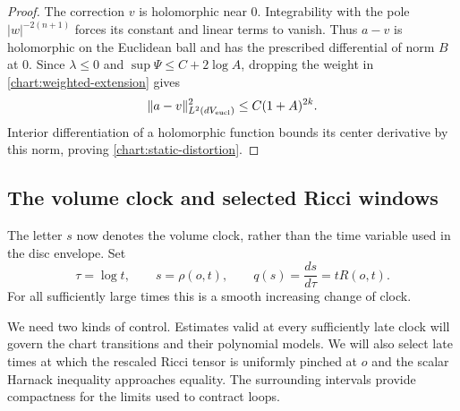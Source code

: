 \documentclass[11pt]{article}
\theoremstyle{definition}
\theoremstyle{remark}
\numberwithin{equation}{section}
\begin{document}
\begin{proof}
The correction $v$ is holomorphic near $0$.  Integrability with
the pole $|w|^{-2(n+1)}$ forces its constant and linear terms
to vanish.  Thus $a-v$ is holomorphic on the Euclidean ball
and has the prescribed differential of norm $B$ at $0$.
Since $\lambda\le0$ and
$\sup\Psi\le C+2\log A$, dropping the weight in
\eqref{chart:weighted-extension} gives
\[
 \|a-v\|_{L^2(dV_{\rm eucl})}^2\le C(1+A)^{2k}.
\]
Interior differentiation of a holomorphic function bounds its
center derivative by this norm, proving
\eqref{chart:static-distortion}.
\end{proof}

\subsection{The volume clock and selected Ricci windows}

The letter $s$ now denotes the volume clock, rather than the time
variable used in the disc envelope.  Set
\begin{equation}\label{chart:clocks}
 \tau=\log t,\qquad s=\rho(o,t),\qquad
 q(s)=\frac{ds}{d\tau}=tR(o,t).
\end{equation}
For all sufficiently large times this is a smooth increasing change
of clock.

We need two kinds of control.  Estimates valid at every sufficiently
late clock will govern the chart transitions and their polynomial
models.  We will also select late times at which the rescaled Ricci
tensor is uniformly pinched at $o$ and the scalar Harnack inequality
approaches equality.  The surrounding intervals provide compactness
for the limits used to contract loops.
\end{document}
